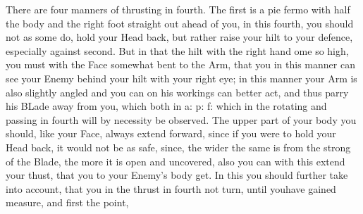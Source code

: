 There are four manners of thrusting in fourth. The first is a pie
fermo with half the body and the right foot straight out ahead of you,
in this fourth, you should not as some do, hold your Head back, but
rather raise your hilt to your defence, especially against second. But
in that the hilt with the right hand ome so high, you must with the
Face somewhat bent to the Arm,
that you in this manner can see your Enemy behind your hilt with your
right eye; in this manner your Arm is also slightly angled  and you
can on his workings can better act, and thus parry his BLade away from
you, which both in a: p: f: which in the rotating and passing in
fourth will by necessity be observed.
The upper part of your body you should, like your Face, always extend
forward, since if you were to hold your Head back, it would not be as
safe, since, the wider the same is from the strong of the Blade, the
more it is open and uncovered, also you can with this extend your
thust, that you to your Enemy's body get.
In this you should further take into account, that you in the thrust
in fourth not turn, until youhave gained measure, and first the point,
